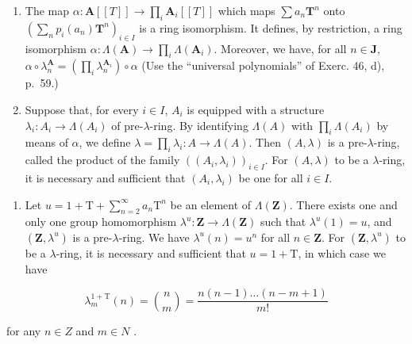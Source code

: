 \begin{enumerate}
\def\labelenumi{\alph{enumi})}
\item
  The map \(\alpha :\mathbf{A}[[T]]\to \prod_i\mathbf{A}_i[[T]]\) which maps \(\sum a_n\mathbf{T}^n\) onto \((\sum_{n}p_i(a_n)\mathbf{T}^n)_{i\in I}\) is a ring isomorphism. It defines, by restriction, a ring isomorphism \(\alpha :\Lambda (\mathbf{A})\to \prod_i\Lambda (\mathbf{A}_i)\). Moreover, we have, for all \(n\in \mathbf{J}\), \(\alpha \circ \lambda_n^{\mathbf{A}} = (\prod_i\lambda_n^{\mathbf{A}_i})\circ \alpha\) (Use the “universal polynomials” of Exerc. 46, d), p.~59.)
\item
  Suppose that, for every \(i \in I\), \(A_i\) is equipped with a structure \(\lambda_i: A_i \to \Lambda(A_i)\) of pre-\(\lambda\)-ring. By identifying \(\Lambda(A)\) with \(\prod_{i} \Lambda(A_i)\) by means of \(\alpha\), we define \(\lambda = \prod_{i} \lambda_i: A \to \Lambda(A)\). Then \((A, \lambda)\) is a pre-\(\lambda\)-ring, called the product of the family \(((A_i, \lambda_i))_{i \in I}\). For \((A, \lambda)\) to be a \(\lambda\)-ring, it is necessary and sufficient that \((A_i, \lambda_i)\) be one for all \(i \in I\).
\end{enumerate}

\begin{enumerate}
\def\labelenumi{\arabic{enumi})}
\setcounter{enumi}{52}
\tightlist
\item
  Let \(u = 1 + \mathrm{T} + \sum_{n=2}^{\infty} a_n \mathrm{T}^n\) be an element of \(\Lambda(\mathbf{Z})\). There exists one and only one group homomorphism \(\lambda^u: \mathbf{Z} \to \Lambda(\mathbf{Z})\) such that \(\lambda^u(1) = u\), and \((\mathbf{Z}, \lambda^u)\) is a pre-\(\lambda\)-ring. We have \(\lambda^u(n) = u^n\) for all \(n \in \mathbf{Z}\). For \((\mathbf{Z}, \lambda^u)\) to be a \(\lambda\)-ring, it is necessary and sufficient that \(u = 1 + \mathrm{T}\), in which case we have
\end{enumerate}

\[
\lambda_ {m} ^ {1 + \mathrm{T}} (n) = \binom {n} {m} = \frac {n (n - 1) \dots (n - m + 1)}{m !}
\]

for any \(n \in Z\) and \(m \in N\) .

